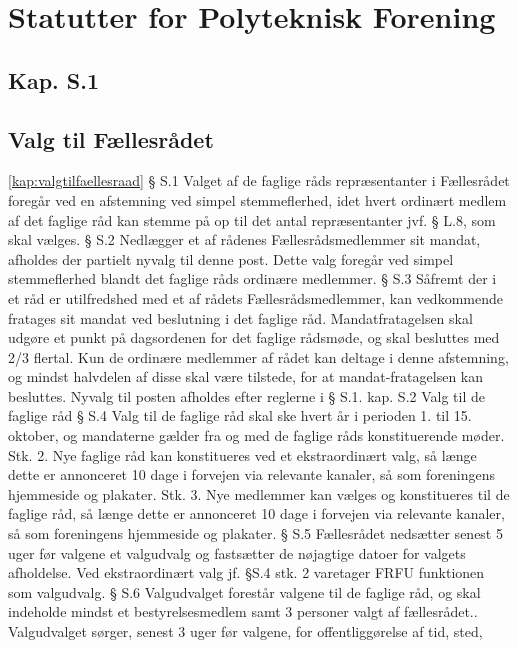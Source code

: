 \section{Statutter for Polyteknisk Forening}
\subsection*{Kap. S.1}
\label{kap:valgtilfaellesraad}
\subsection{Valg til Fællesrådet}

\ref{kap:valgtilfaellesraad}
§ S.1 Valget af de faglige råds repræsentanter i Fællesrådet foregår ved en afstemning ved simpel stemmeflerhed,
           idet hvert ordinært medlem af det faglige råd kan stemme på op til det antal repræsentanter jvf. § L.8, som
               skal vælges.
§ S.2 Nedlægger et af rådenes Fællesrådsmedlemmer sit mandat, afholdes der partielt nyvalg til denne post. Dette
          valg foregår ved simpel stemmeflerhed blandt det faglige råds ordinære medlemmer.
§ S.3 Såfremt der i et råd er utilfredshed med et af rådets Fællesrådsmedlemmer, kan vedkommende fratages sit
           mandat ved beslutning i det faglige råd.
           Mandatfratagelsen skal udgøre et punkt på dagsordenen for det faglige rådsmøde, og skal besluttes med 2/3
              flertal. Kun de ordinære medlemmer af rådet kan deltage i denne afstemning, og mindst halvdelen af disse
               skal være tilstede, for at mandat-fratagelsen kan besluttes.
               Nyvalg til posten afholdes efter reglerne i § S.1.
kap. S.2 Valg til de faglige råd
§ S.4
Valg til de faglige råd skal ske hvert år i perioden 1. til 15. oktober, og mandaterne gælder fra og med de
faglige råds konstituerende møder.
Stk. 2. Nye faglige råd kan konstitueres ved et ekstraordinært valg, så længe dette er annonceret 10 dage i
forvejen via relevante kanaler, så som foreningens hjemmeside og plakater.
Stk. 3. Nye medlemmer kan vælges og konstitueres til de faglige råd, så længe dette er annonceret 10 dage i
forvejen via relevante kanaler, så som foreningens hjemmeside og plakater.
§ S.5 Fællesrådet nedsætter senest 5 uger før valgene et valgudvalg og fastsætter de nøjagtige datoer for valgets
            afholdelse. Ved ekstraordinært valg jf. §S.4 stk. 2 varetager FRFU funktionen som valgudvalg.
§ S.6 Valgudvalget forestår valgene til de faglige råd, og skal indeholde mindst et bestyrelsesmedlem samt 3
        personer valgt af fællesrådet.. Valgudvalget sørger, senest 3 uger før valgene, for offentliggørelse af tid, sted,
